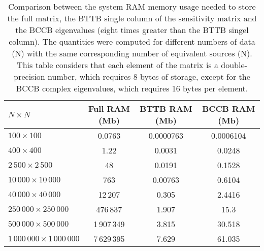 \documentclass[manuscript,revised]{geophysics}
\begin{document}
\begin{table}[h]
	\begin{center}
		\begin{tabular}{|l|c|c|c|}
			\hline
			\textbf{$N \times N$} & \textbf{Full RAM (Mb)} & \textbf{BTTB RAM (Mb)}  & \textbf{BCCB RAM (Mb)}\\
			\hline 
			$100 \times 100$ & 0.0763 & 0.0000763 & 0.0006104\\
			\hline
			$400 \times 400$ & 1.22 & 0.0031 & 0.0248\\
			\hline
			$2\,500 \times 2\,500$ & 48 & 0.0191 & 0.1528\\
			\hline
			$10\,000 \times 10\,000$ & 763 & 0.00763 & 0.6104\\
			\hline
			$40\,000 \times 40\,000$ & 12\,207 & 0.305 & 2.4416 \\
			\hline
			$250\,000 \times 250\,000$ & 476\,837 & 1.907 & 15.3 \\
			\hline
			$500\,000 \times 500\,000$ & 1\,907\,349 & 3.815 & 30.518 \\
			\hline
			$1\,000\,000 \times 1\,000\,000$ & 7\,629\,395 & 7.629 & 61.035 \\
			\hline
		\end{tabular}
		\caption{Comparison between the system RAM memory usage needed to store the full matrix, the BTTB single column of the sensitivity matrix and the BCCB eigenvalues (eight times greater than the BTTB singel column). The quantities were computed for different numbers of data (N) with the same corresponding number of equivalent sources (N). This table considers that each element of the matrix is a double-precision number, which requires 8 bytes of storage, except for the BCCB complex eigenvalues, which requires 16 bytes per element.}
	\end{center}
\end{table} 
\end{document}
